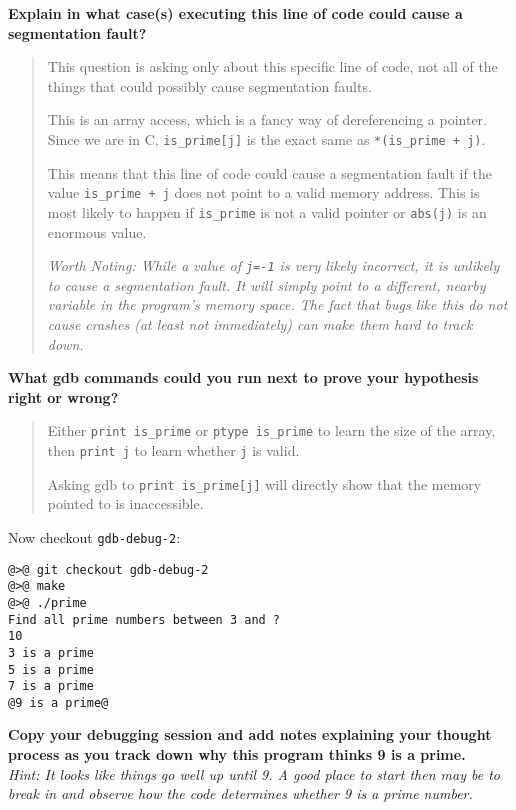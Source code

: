 \documentclass{article}
\begin{document}
\textbf{Explain in what case(s) executing this line of code could cause a
  segmentation fault?}
\begin{quote}
  \color{violet}
  This question is asking only about this specific line of code, not all of
  the things that could possibly cause segmentation faults.

  This is an array access, which is a fancy way of dereferencing a pointer.
  Since we are in C, \texttt{is\_prime[j]} is the exact same as
  \texttt{*(is\_prime + j)}.

  This means that this line of code could cause a segmentation fault if the
  value \texttt{is\_prime + j} does not point to a valid memory address.
  This is most likely to happen if \texttt{is\_prime} is not a valid pointer
  or \texttt{abs(j)} is an enormous value.

  \emph{Worth Noting: While a value of \texttt{j=-1} is very likely incorrect,
    it is unlikely to cause a segmentation fault. It will simply point to a
    different, nearby variable in the program's memory space. The fact that
    bugs like this do not cause crashes (at least not immediately) can make
    them hard to track down.}
\end{quote}

\textbf{What gdb commands could you run next to prove your hypothesis right or
  wrong?}
\begin{quote}
  \color{violet}
  Either \texttt{print is\_prime} or \texttt{ptype is\_prime} to learn the
  size of the array, then \texttt{print j} to learn whether \texttt{j} is
  valid.

  Asking gdb to \texttt{print is\_prime[j]} will directly show that the memory
  pointed to is inaccessible.
\end{quote}


\vspace{2cm}
Now checkout \texttt{gdb-debug-2}:
\begin{lstlisting}
@>@ git checkout gdb-debug-2
@>@ make
@>@ ./prime
Find all prime numbers between 3 and ?
10
3 is a prime
5 is a prime
7 is a prime
@9 is a prime@
\end{lstlisting}
\textbf{Copy your debugging session and add notes explaining your
  thought process as you track down why this program thinks 9 is a prime.}\\
\emph{\small Hint: It looks like things go well up until 9. A good place to
  start then may be to break in and observe how the code determines whether 9
  is a prime number.}
\end{document}
